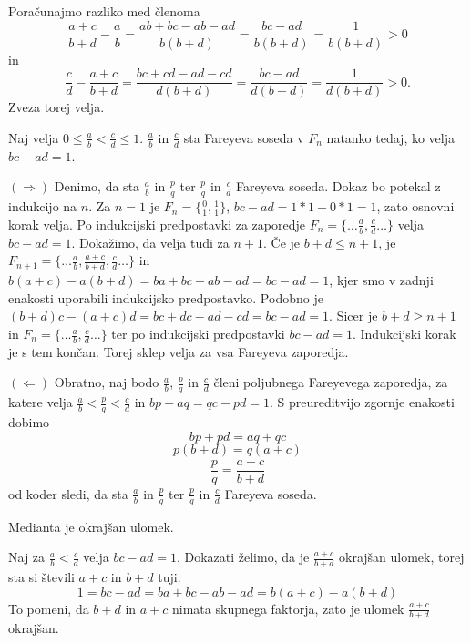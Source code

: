 \documentclass[mat1]{fmfdelo}
\begin{document}
\begin{dokaz}
Poračunajmo razliko med členoma
\[\frac{a+c}{b+d} - \frac{a}{b} = \frac{ab+bc-ab-ad}{b(b+d)} = \frac{bc-ad}{b(b+d)} = \frac{1}{b(b+d)} > 0\] in
\[\frac{c}{d} - \frac{a+c}{b+d} = \frac{bc+cd-ad-cd}{d(b+d)} = \frac{bc-ad}{d(b+d)} = \frac{1}{d(b+d)} > 0.\]
Zveza torej velja. 
\end{dokaz}

\begin{trditev}
Naj velja \( 0 \leq \frac{a}{b} < \frac{c}{d} \leq 1\). $\frac{a}{b}$ in $\frac{c}{d}$ sta Fareyeva soseda v $F_n$ natanko tedaj, ko velja \(bc - ad = 1\).
\end{trditev}

\begin{dokaz}
$(\Rightarrow)$ Denimo, da sta $\frac{a}{b}$ in $\frac{p}{q}$ ter $\frac{p}{q}$ in $\frac{c}{d}$ Fareyeva soseda. Dokaz bo potekal z indukcijo na $n$.
Za $n=1$ je $F_n = \{\frac{0}{1}, \frac{1}{1}\}$, $bc - ad = 1*1 - 0*1 = 1$, zato osnovni korak velja.
Po indukcijski predpostavki za zaporedje \( F_n = \{\ldots \frac{a}{b}, \frac{c}{d} \ldots \} \) velja $bc - ad = 1$. Dokažimo, da velja tudi za $n+1$. Če je $b+d \leq n+1$, je \( F_{n+1} = \{\ldots \frac{a}{b}, \frac{a+c}{b+d}, \frac{c}{d} \ldots \} \) in $b(a + c) - a(b + d) = ba + bc - ab - ad = bc - ad = 1$, kjer smo v zadnji enakosti uporabili indukcijsko predpostavko. Podobno je $(b + d)c - (a + c)d = bc + dc - ad - cd = bc - ad = 1$. Sicer je $b+d \geq n+1$ in \( F_n = \{\ldots \frac{a}{b}, \frac{c}{d} \ldots \} \) ter po indukcijski predpostavki $bc - ad = 1$. Indukcijski korak je s tem končan. Torej sklep velja za vsa Fareyeva zaporedja.

$(\Leftarrow)$ Obratno, naj bodo $\frac{a}{b}$, $\frac{p}{q}$ in $\frac{c}{d}$ členi poljubnega Fareyevega zaporedja, za katere velja $\frac{a}{b} <\frac{p}{q} < \frac{c}{d}$ in $bp - aq = qc - pd = 1$. S preureditvijo zgornje enakosti dobimo
\[ bp + pd = aq + qc \]
\[ p(b + d) = q(a + c) \]
\[ \frac{p}{q} = \frac{a+c}{b+d} \]
od koder sledi, da sta $\frac{a}{b}$ in $\frac{p}{q}$ ter $\frac{p}{q}$ in $\frac{c}{d}$ Fareyeva soseda.
\end{dokaz}

\begin{lema}
Medianta je okrajšan ulomek.
\end{lema}

\begin{dokaz}
Naj za $\frac{a}{b} < \frac{c}{d}$ velja $bc - ad = 1$. Dokazati želimo, da je $\frac{a+c}{b+d}$ okrajšan ulomek, torej sta si števili $a+c$ in $b+d$ tuji. 
\[ 1 = bc - ad = ba + bc - ab - ad = b(a + c) - a(b + d) \]
To pomeni, da $b + d$ in $a + c$ nimata skupnega faktorja, zato je ulomek $\frac{a+c}{b+d}$ okrajšan.
\end{dokaz}
\end{document}
